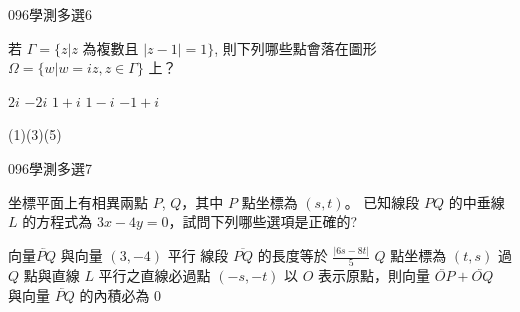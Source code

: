 \begin{QUESTIONS}
    \begin{QUESTION}
        \begin{ExamInfo}{096}{學測}{多選}{6}
        \end{ExamInfo}
        \begin{ExamAnsRateInfo}{19}{35}{12}{10}
        \end{ExamAnsRateInfo}
        \begin{QBODY}
			若 $\Gamma = \{ z|z$ 為複數且 $|z - 1|=1\}$, 則下列哪些點會落在圖形 $\Omega =\{w|w=iz,z \in \Gamma \}$ 上？  
			\begin{QOPS} 
				\QOP $2i$    \QOP $-2i$ 
				\QOP $1+i$ 
				\QOP $1-i$ 
				\QOP $-1+i$
			\end{QOPS}
        \end{QBODY}
        \begin{QFROMS}
        \end{QFROMS}
        \begin{QTAGS}\end{QTAGS}
        \begin{QANS}
            (1)(3)(5)
        \end{QANS}
        \begin{QSOLLIST}
        \end{QSOLLIST}
        \begin{QEMPTYSPACE}
        \end{QEMPTYSPACE}
    \end{QUESTION}
    \begin{QUESTION}
        \begin{ExamInfo}{096}{學測}{多選}{7}
        \end{ExamInfo}
        \begin{ExamAnsRateInfo}{25}{42}{20}{13}
        \end{ExamAnsRateInfo}
        \begin{QBODY}
			坐標平面上有相異兩點 $P$, $Q$，其中 $P$ 點坐標為 $(s,t)$。
			已知線段 $PQ$ 的中垂線 $L$ 的方程式為 $3x - 4 y = 0$，試問下列哪些選項是正確的? 
    		\begin{QOPS} 
    			\QOP 向量$\lvec{PQ}$ 與向量 $(3,-4)$  平行 
    			\QOP 線段 $\overline{PQ}$ 的長度等於 $\frac{|6s-8t|}{5}$ 
    			\QOP $Q$ 點坐標為 $(t,s)$ 
    			\QOP 過 $Q$ 點與直線 $L$ 平行之直線必過點 $(-s,-t)$ 
    			\QOP 以 $O$ 表示原點，則向量 $\lvec{OP}+\lvec{OQ}$ 與向量 $\lvec{PQ}$ 的內積必為 0 
    		\end{QOPS}
        \end{QBODY}

\end{QUESTION}
\end{QUESTIONS}
